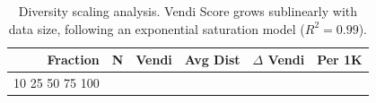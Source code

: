 \begin{table}[t]
\centering
\caption{Diversity scaling analysis. Vendi Score grows sublinearly with data size, following an exponential saturation model ($R^2 = 0.99$).}
\label{tab:scaling}
\small
\begin{tabular}{rrrrrr}
\toprule
\textbf{Fraction} & \textbf{N} & \textbf{Vendi} & \textbf{Avg Dist} & \textbf{$\Delta$ Vendi} & \textbf{Per 1K} \\
\midrule
10%
25%
50%
75%
100%
\bottomrule
\end{tabular}
\end{table}
